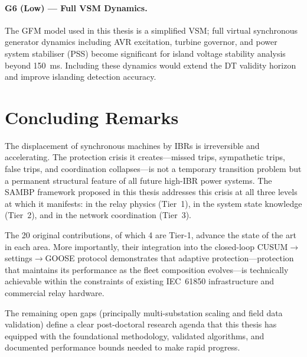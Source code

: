 \paragraph{G6 (Low) — Full VSM Dynamics.}
The GFM model used in this thesis is a simplified VSM; full virtual
synchronous generator dynamics including AVR excitation, turbine governor,
and power system stabiliser (PSS) become significant for island voltage
stability analysis beyond 150~ms. Including these dynamics would extend
the DT validity horizon and improve islanding detection accuracy.

\section{Concluding Remarks}
\label{sec:ch10_concluding}

The displacement of synchronous machines by IBRs is irreversible and
accelerating. The protection crisis it creates—missed trips, sympathetic
trips, false trips, and coordination collapses—is not a temporary
transition problem but a permanent structural feature of all future
high-IBR power systems. The SAMBP framework proposed in this thesis
addresses this crisis at all three levels at which it manifests:
in the relay physics (Tier~1), in the system state knowledge
(Tier~2), and in the network coordination (Tier~3).

The 20 original contributions, of which 4 are Tier-1, advance the
state of the art in each area. More importantly, their integration
into the closed-loop CUSUM$\to$settings$\to$GOOSE protocol demonstrates
that adaptive protection—protection that maintains its performance
as the fleet composition evolves—is technically achievable within
the constraints of existing IEC~61850 infrastructure and commercial
relay hardware.

The remaining open gaps (principally multi-substation scaling and
field data validation) define a clear post-doctoral research agenda
that this thesis has equipped with the foundational methodology,
validated algorithms, and documented performance bounds needed to
make rapid progress.
